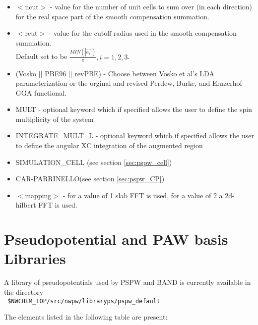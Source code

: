 \begin{itemize}
        \item $<$ncut$>$ - value for the number of unit cells
                          to sum over (in each direction) for the real space
                          part of the smooth compensation summation. 
        \item $<$rcut$>$ - value for the cutoff radius used
                          in the smooth compensation summation. \\
                           Default set to be
                          $\frac{MIN(\left| \vec{a_i} \right|)}{\pi}, i=1,2,3$.
        \item (Vosko $||$ PBE96 $||$ revPBE) - Choose between Vosko et al's LDA 
                               parameterization or the orginal and revised Perdew, Burke, 
                               and Ernzerhof GGA functional.
        \item MULT - optional keyword which if specified allows the user to define the spin multiplicity
                     of the system
        \item INTEGRATE\_MULT\_L - optional keyword which if specified allows the user to define the 
                                   angular XC integration of the augmented region
        \item SIMULATION\_CELL (see section \ref{sec:pspw_cell})
        \item CAR-PARRINELLO(see section \ref{sec:pspw_CP})


        \item $<$mapping$>$ - for a value of 1 slab FFT is used, for a value of 2 a 2d-hilbert FFT is used.
\end{itemize}


\section{Pseudopotential and PAW basis Libraries}
\label{sec:psp_library}

A library of pseudopotentials used by PSPW and BAND is currently available  in the
directory \\
\verb+ $NWCHEM_TOP/src/nwpw/libraryps/pspw_default+

The elements listed in the following table are present:

